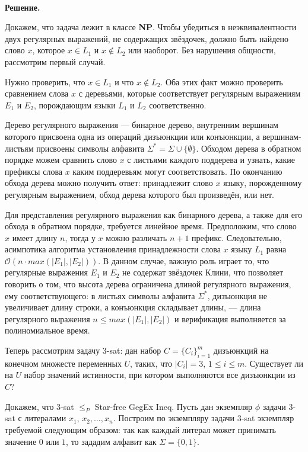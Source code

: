 \documentclass[10pt]{article}
\begin{document}
\ \\[0.3cm]
\textbf{Решение.}  
\medskip\par 
Докажем, что задача лежит в классе \textbf{NP}. Чтобы убедиться в неэквивалентности двух регулярных выражений, не содержащих звёздочек, должно быть найдено слово $x$, которое $x\in L_1$ и $x\not\in L_2$ или наоборот. Без нарушения общности, рассмотрим первый случай.
\medskip\par Нужно проверить, что $x\in L_1$ и что $x\not\in L_2$. Оба этих факт можно проверить сравнением слова $x$ с деревьями, которые соответствует регулярным выражениям $E_1$ и $E_2$, порождающим языки $L_1$ и $L_2$ соответственно.
\medskip\par Дерево регулярного выражения --- бинарное дерево, внутренним вершинам которого присвоена одна из операций дизъюнкции или конъюнкции, а вершинам-листьям присвоены символы алфавита $\Sigma^*=\Sigma \cup \{\emptyset\}$. Обходом дерева в обратном порядке можем сравнить слово $x$ с листьями каждого поддерева и узнать, какие префиксы слова $x$ каким поддеревьям могут соответствовать. По окончанию обхода дерева можно получить ответ: принадлежит слово $x$ языку, порожденному регулярным выражением, обход дерева которого был произведён, или нет.
\medskip\par Для представления регулярного выражения как бинарного дерева, а также для его обхода в обратном порядке, требуется линейное время. Предположим, что слово $x$ имеет длину $n$, тогда у $x$ можно различать $n+1$ префикс. Следовательно, асимпотика алгоритма установления принадлежности слова $x$ языку $L_1$ равна $\mathcal{O}\left(n\cdot max\left(|E_1|,|E_2|\right)\right)$. В данном случае, важную роль играет то, что регулярные выражения $E_1$ и $E_2$ не содержат звёздочек Клини, что позволяет говорить о том, что высота дерева ограничена длиной регулярного выражения, ему соответствующего: в листьях символы алфавита $\Sigma^*$, дизъюнкция не увеличивает длину строки, а конъюнкция складывает длины, --- длина регулярного выражения $n\leq max\left(|E_1|,|E_2|\right)$ и верификация выполняется за полиномиальное время.
\medskip\par Теперь рассмотрим задачу $3$-sat: дан набор $C=\{C_i\}_{i=1}^m$ дизъюнкций на конечном множесте переменных $U$, таких, что $|C_i|=3$, $1\leq i\leq m$. Существует ли на $U$ набор значений истинности, при котором выполняются все дизъюнкции из $C$?
\medskip\par Докажем, что 3-sat $\leq_P$ Star-free GegEx Ineq. Пусть дан экземпляр $\phi$ задачи $3$-sat с литералами $x_1$, $x_2, \dots, x_n$. Построим по экземпляру задачи $3$-sat экземпляр требуемой следующим образом: так как каждый литерал может принимать значение $0$ или $1$, то зададим алфавит как $\Sigma=\{0, 1\}$.
\end{document}
